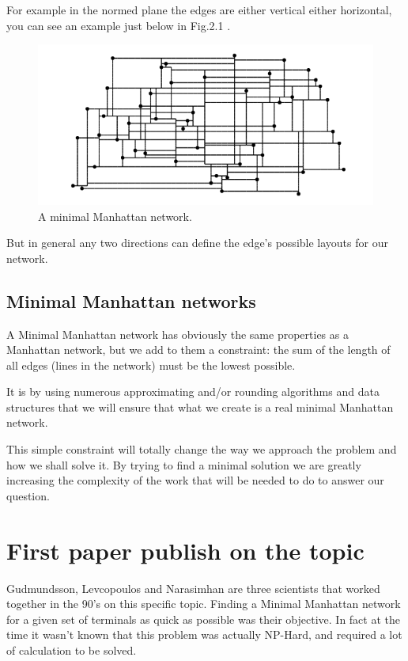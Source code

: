 	For example in the normed plane the edges are either vertical either horizontal, you can see an example just below in Fig.2.1 . 
	
\begin{figure}[H]
  \includegraphics[width=\linewidth]{img/mn_example.png}
  \caption{A minimal Manhattan network.}
  \label{fig:mn_expamle}
\end{figure}
But in general any two directions can define the edge's possible layouts for our network.
\subsection{Minimal Manhattan networks}
A Minimal Manhattan network has obviously the same properties as a Manhattan network, but we add to them a constraint: the sum of the length of all edges (lines in the network) must be the lowest possible.

It is by using numerous approximating and/or rounding algorithms and data structures that we will ensure that what we create is a real minimal Manhattan network.

This simple constraint will totally change the way we approach the problem and how we shall solve it. By trying to find  a minimal solution we are greatly increasing the complexity of the work that will be needed to do to answer our question.

\section{First paper publish on the topic}%
Gudmundsson, Levcopoulos and Narasimhan are three scientists that worked together in the 90's on this specific topic. Finding a Minimal Manhattan network for a given set of terminals as quick as possible was their objective. In fact at the time it wasn't known that this problem was actually NP-Hard, and required a lot of calculation to be solved.

